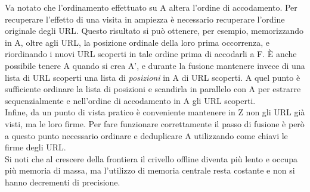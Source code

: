 Va notato che l'ordinamento effettuato su A altera l'ordine di accodamento. Per recuperare l'effetto di una visita in ampiezza è necessario recuperare l'ordine originale degli URL. Questo risultato si può ottenere, per esempio, memorizzando in A, oltre agli URL, la posizione ordinale della loro prima occorrenza, e riordinando i nuovi URL scoperti in tale ordine prima di accodarli a F. È anche possibile tenere A quando si crea A', e durante la fusione mantenere invece di una lista di URL scoperti una lista di \textit{posizioni} in A di URL scoperti. A quel punto è sufficiente ordinare la lista di posizioni e scandirla in parallelo con A per estrarre sequenzialmente e nell'ordine di accodamento in A gli URL scoperti.\\
Infine, da un punto di vista pratico è conveniente mantenere in Z non gli URL già visti, ma le loro firme. Per fare funzionare correttamente il passo di fusione è però a questo punto necessario ordinare e deduplicare A utilizzando come chiavi le firme degli URL.\\
Si noti che al crescere della frontiera il crivello offline diventa più lento e occupa più memoria di massa, ma l'utilizzo di memoria centrale resta costante e non si hanno decrementi di precisione.
